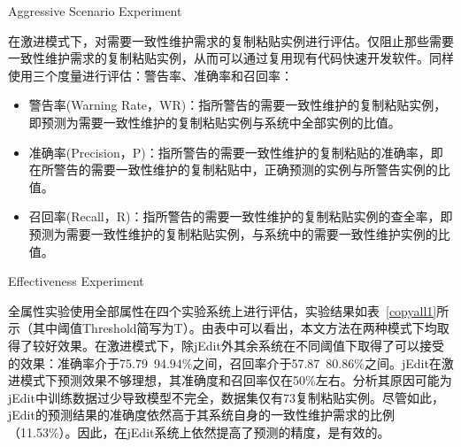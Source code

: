 {Aggressive Scenario Experiment}


在激进模式下，对需要一致性维护需求的复制粘贴实例进行评估。仅阻止那些需要一致性维护需求的复制粘贴实例，从而可以通过复用现有代码快速开发软件。同样使用三个度量进行评估：警告率、准确率和召回率：
\begin{itemize}
\item	警告率(Warning Rate，WR)：指所警告的需要一致性维护的复制粘贴实例，即预测为需要一致性维护的复制粘贴实例与系统中全部实例的比值。
\item	准确率(Precision，P)：指所警告的需要一致性维护的复制粘贴的准确率，即在所警告的需要一致性维护的复制粘贴中，正确预测的实例与所警告实例的比值。
\item	召回率(Recall，R)：指所警告的需要一致性维护的复制粘贴实例的查全率，即预测为需要一致性维护的复制粘贴实例，与系统中的需要一致性维护实例的比值。
\end{itemize}


{Effectiveness Experiment}

全属性实验使用全部属性在四个实验系统上进行评估，实验结果如表~\ref{copyall1}所示（其中阈值Threshold简写为T）。由表中可以看出，本文方法在两种模式下均取得了较好效果。在激进模式下，除jEdit外其余系统在不同阈值下取得了可以接受的效果：准确率介于75.79~94.94\%之间，召回率介于57.87~80.86\%之间。jEdit在激进模式下预测效果不够理想，其准确度和召回率仅在50\%左右。分析其原因可能为jEdit中训练数据过少导致模型不完全，数据集仅有73复制粘贴实例。尽管如此，jEdit的预测结果的准确度依然高于其系统自身的一致性维护需求的比例（11.53\%）。因此，在jEdit系统上依然提高了预测的精度，是有效的。

